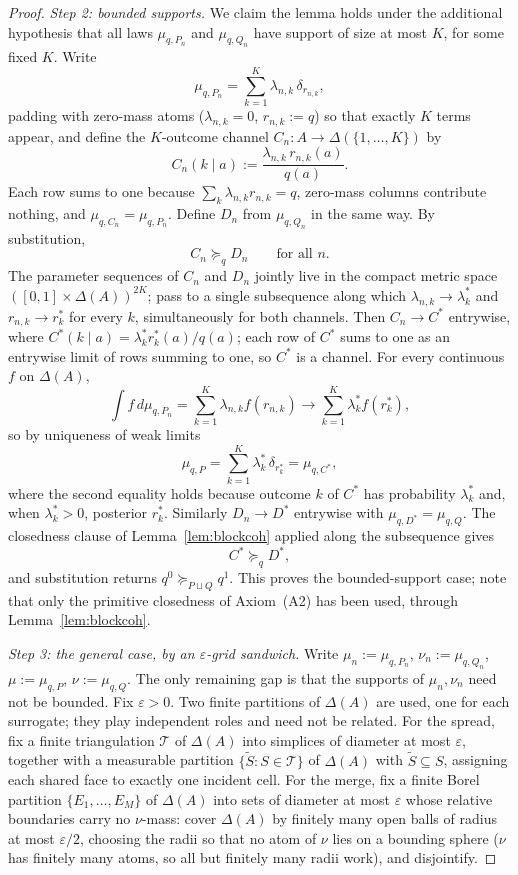 \documentclass[11pt,a4paper]{article}
\theoremstyle{definition}
\newcommand{\1}{\mathbf 1}
\begin{document}
\begin{proof}
\emph{Step 2: bounded supports.}
We claim the lemma holds under the additional hypothesis that all laws $\mu_{q,P_n}$ and $\mu_{q,Q_n}$ have support of
size at most $K$, for some fixed $K$.  Write
\[
\mu_{q,P_n}=\sum_{k=1}^{K}\lambda_{n,k}\,\delta_{r_{n,k}},
\]
padding with zero-mass atoms ($\lambda_{n,k}=0$, $r_{n,k}:=q$) so that exactly $K$ terms appear, and define the
$K$-outcome channel $C_n:A\to\Delta(\{1,\dots,K\})$ by
\[
C_n(k\mid a):=\frac{\lambda_{n,k}\,r_{n,k}(a)}{q(a)}.
\]
Each row sums to one because $\sum_k\lambda_{n,k}r_{n,k}=q$, zero-mass columns contribute nothing, and
$\mu_{q,C_n}=\mu_{q,P_n}$.  Define $D_n$ from $\mu_{q,Q_n}$ in the same way.  By substitution,
\[
C_n\succeq_q D_n
\qquad\text{for all }n.
\]
The parameter sequences of $C_n$ and $D_n$ jointly live in the compact metric space
$([0,1]\times\Delta(A))^{2K}$; pass to a single subsequence along which $\lambda_{n,k}\to\lambda_k^\ast$ and
$r_{n,k}\to r_k^\ast$ for every $k$, simultaneously for both channels.  Then $C_n\to C^\ast$ entrywise, where
$C^\ast(k\mid a)=\lambda_k^\ast r_k^\ast(a)/q(a)$; each row of $C^\ast$ sums to one as an entrywise limit of rows
summing to one, so $C^\ast$ is a channel.  For every continuous $f$ on $\Delta(A)$,
\[
\int f\,d\mu_{q,P_n}
=
\sum_{k=1}^{K}\lambda_{n,k}f(r_{n,k})
\longrightarrow
\sum_{k=1}^{K}\lambda_k^\ast f(r_k^\ast),
\]
so by uniqueness of weak limits
\[
\mu_{q,P}=\sum_{k=1}^{K}\lambda_k^\ast\,\delta_{r_k^\ast}
=\mu_{q,C^\ast},
\]
where the second equality holds because outcome $k$ of $C^\ast$ has probability $\lambda_k^\ast$ and, when
$\lambda_k^\ast>0$, posterior $r_k^\ast$.  Similarly $D_n\to D^\ast$ entrywise with
$\mu_{q,D^\ast}=\mu_{q,Q}$.  The closedness clause of Lemma~\ref{lem:blockcoh} applied along the subsequence gives
\[
C^\ast\succeq_q D^\ast,
\]
and substitution returns $q^0\succeq_{P\sqcup Q}q^1$.  This proves the bounded-support case; note that only the
primitive closedness of Axiom~\textup{(A2)} has been used, through Lemma~\ref{lem:blockcoh}.

\emph{Step 3: the general case, by an $\varepsilon$-grid sandwich.}
Write $\mu_n:=\mu_{q,P_n}$, $\nu_n:=\mu_{q,Q_n}$, $\mu:=\mu_{q,P}$, $\nu:=\mu_{q,Q}$.  The only remaining gap is that
the supports of $\mu_n,\nu_n$ need not be bounded.  Fix $\varepsilon>0$.  Two finite partitions of $\Delta(A)$ are
used, one for each surrogate; they play independent roles and need not be related.  For the spread, fix a finite
triangulation $\mathcal T$ of $\Delta(A)$ into simplices of diameter at most $\varepsilon$, together with a measurable
partition $\{\widetilde S:S\in\mathcal T\}$ of $\Delta(A)$ with $\widetilde S\subseteq S$, assigning each shared face
to exactly one incident cell.  For the merge, fix a finite Borel partition $\{E_1,\dots,E_M\}$ of $\Delta(A)$ into
sets of diameter at most $\varepsilon$ whose relative boundaries carry no $\nu$-mass: cover $\Delta(A)$ by finitely
many open balls of radius at most $\varepsilon/2$, choosing the radii so that no atom of $\nu$ lies on a bounding
sphere ($\nu$ has finitely many atoms, so all but finitely many radii work), and disjointify.


\end{proof}
\end{document}
